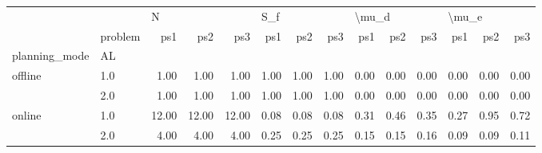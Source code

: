 \begin{tabular}{llrrrrrrrrrrrr}
\toprule
       & {} & \multicolumn{3}{l}{N} & \multicolumn{3}{l}{S\_f} & \multicolumn{3}{l}{\textbackslash mu\_d} & \multicolumn{3}{l}{\textbackslash mu\_e} \\
       & problem &   ps1 &   ps2 &   ps3 &  ps1 &  ps2 &  ps3 &   ps1 &  ps2 &  ps3 &   ps1 &  ps2 &  ps3 \\
planning\_mode & AL &       &       &       &      &      &      &       &      &      &       &      &      \\
\midrule
offline & 1.0 &  1.00 &  1.00 &  1.00 & 1.00 & 1.00 & 1.00 &  0.00 & 0.00 & 0.00 &  0.00 & 0.00 & 0.00 \\
       & 2.0 &  1.00 &  1.00 &  1.00 & 1.00 & 1.00 & 1.00 &  0.00 & 0.00 & 0.00 &  0.00 & 0.00 & 0.00 \\
online & 1.0 & 12.00 & 12.00 & 12.00 & 0.08 & 0.08 & 0.08 &  0.31 & 0.46 & 0.35 &  0.27 & 0.95 & 0.72 \\
       & 2.0 &  4.00 &  4.00 &  4.00 & 0.25 & 0.25 & 0.25 &  0.15 & 0.15 & 0.16 &  0.09 & 0.09 & 0.11 \\
\bottomrule
\end{tabular}
